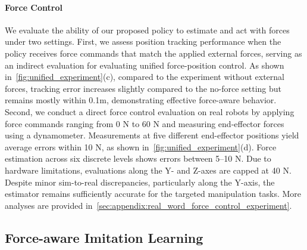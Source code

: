 \documentclass{article}
\begin{document}
\paragraph{Force Control}
We evaluate the ability of our proposed policy to estimate and act with forces under two settings. First, we assess position tracking performance when the policy receives force commands that match the applied external forces, serving as an indirect evaluation for evaluating unified force-position control. As shown in~\cref{fig:unified_experiment}(c), compared to the experiment without external forces, tracking error increases slightly compared to the no-force setting but remains mostly within 0.1m, demonstrating effective force-aware behavior. Second, we conduct a direct force control evaluation on real robots by applying force commands ranging from 0 N to 60 N and measuring end-effector forces using a dynamometer. Measurements at five different end-effector positions yield average errors within 10 N, as shown in~\cref{fig:unified_experiment}(d). Force estimation across six discrete levels shows errors between 5–10 N. Due to hardware limitations, evaluations along the Y- and Z-axes are capped at 40 N. Despite minor sim-to-real discrepancies, particularly along the Y-axis, the estimator remains sufficiently accurate for the targeted manipulation tasks. More analyses are provided in~\cref{sec:appendix:real_word_force_control_experiment}.


\subsection{Force-aware Imitation Learning}\label{sec:exp:imitation}

\end{document}

